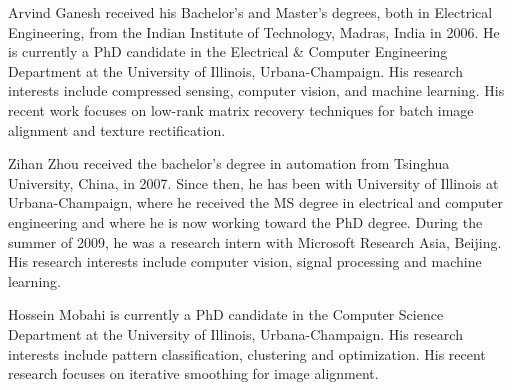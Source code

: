 \documentclass[10pt,journal,letterpaper,compsoc]{IEEEtran}
\begin{document}
\biospace
\begin{IEEEbiography}{Arvind Ganesh}
received his Bachelor's and Master's degrees, both in Electrical
Engineering, from the Indian Institute of Technology, Madras, India in 2006. He
is currently a PhD candidate in the Electrical \& Computer Engineering
Department at the University of Illinois, Urbana-Champaign. His research
interests include compressed sensing, computer vision, and machine learning.
His recent work focuses on low-rank matrix recovery techniques for
batch image alignment and texture rectification.  \end{IEEEbiography}

\biospace
\begin{IEEEbiography}{Zihan Zhou} received the bachelor's degree in automation from Tsinghua
University, China, in 2007. Since then, he has been with
University of Illinois at Urbana-Champaign, where he received
the MS degree in electrical and computer engineering and where
he is now working toward the PhD degree. During the summer of
2009, he was a research intern with Microsoft Research Asia,
Beijing. His research interests include computer vision, signal
processing and machine learning.
\end{IEEEbiography}

\biospace
\begin{IEEEbiography}{Hossein Mobahi} is currently a PhD
candidate in the Computer Science Department at the University of Illinois,
Urbana-Champaign. His research interests include pattern classification,
clustering and optimization.  His recent research focuses on iterative
smoothing for image alignment.  \end{IEEEbiography}
\end{document}
